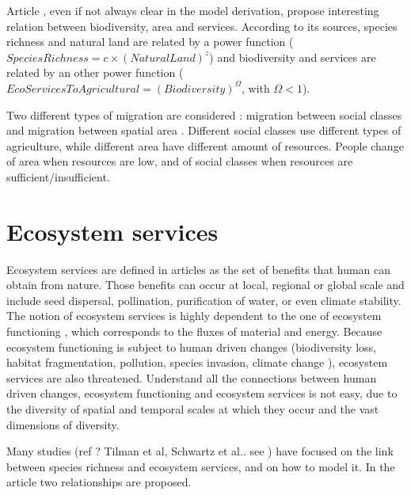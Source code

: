 \documentclass{article}
\begin{document}
Article \cite{lafuite_time-delayed_2017}, even if not always clear in the model derivation, propose interesting relation between biodiversity, area and services. According to its sources, species richness and natural land are related by a power function ($SpeciesRichness = c \times (NaturalLand) ^ {z}$) and biodiversity and services are related by an other power function ($ EcoServicesToAgricultural = (Biodiversity)^\Omega$, with $\Omega < 1$).

\medskip
Two different types of migration are considered : migration between social classes \cite{henderson_unequal_2021, roman_dynamics_2018} and migration between spatial area \cite{henderson_unequal_2021, roman_coupled_2017}. Different social classes use different types of agriculture, while different area have different amount of resources. People change of area when resources are low, and of social classes when resources are sufficient/insufficient. 

\section{Ecosystem services}

Ecosystem services are defined in articles \cite{isbell_linking_2017, kremen_managing_2005} as the set of benefits that human can obtain from nature. Those benefits can occur at local, regional or global scale \cite{kremen_managing_2005, isbell_linking_2017} and include seed dispersal, pollination, purification of water, or even climate stability. The notion of ecosystem services is highly dependent to the one of ecosystem functioning \cite{isbell_linking_2017}, which corresponds to the fluxes of material and energy. Because ecosystem functioning is subject to human driven changes (biodiversity loss, habitat fragmentation, pollution, species invasion, climate change \cite{isbell_linking_2017}), ecosystem services are also threatened. Understand all the connections between human driven changes, ecosystem functioning and ecosystem services is not easy, due to the diversity of spatial and temporal scales at which they occur and the vast dimensions of diversity.

\medskip
Many studies (ref ? Tilman et al, Schwartz et al.. see \cite{kremen_managing_2005}) have focused on the link between species richness and ecosystem services, and on how to model it. In the article \cite{kremen_managing_2005} two relationships are proposed. 
\end{document}
